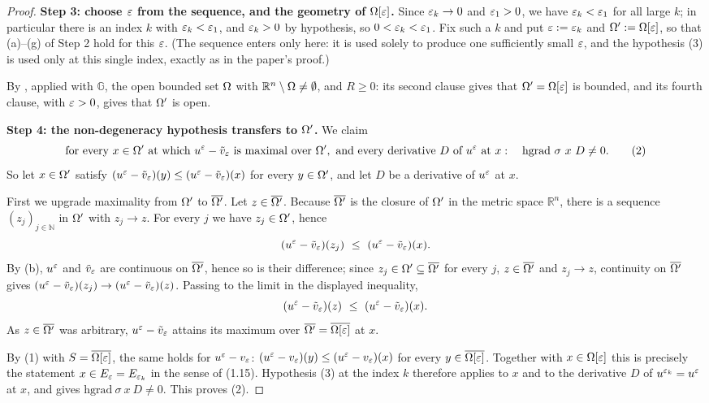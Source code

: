\begin{proof}
\medskip\noindent\textbf{Step 3: choose $\varepsilon$ from the sequence, and the geometry of
$\Omega[\varepsilon]$.} Since $\varepsilon_k\to0$ and $\varepsilon_1>0$, we have $\varepsilon_k<\varepsilon_1$ for all large
$k$; in particular there is an index $k$ with $\varepsilon_k<\varepsilon_1$, and $\varepsilon_k>0$ by
hypothesis, so $0<\varepsilon_k<\varepsilon_1$. Fix such a $k$ and put
$\varepsilon:=\varepsilon_k$ and $\Omega':=\Omega[\varepsilon]$, so that (a)--(g) of Step 2 hold for this $\varepsilon$. (The
sequence enters only here: it is used solely to produce one sufficiently small $\varepsilon$, and
the hypothesis (3) is used only at this single index, exactly as in the paper's proof.)

By , applied with $\mathbb G$, the open bounded set $\Omega$
with $\mathbb R^{n}\setminus\Omega\ne\emptyset$, and $R\ge0$: its second clause gives that
$\Omega'=\Omega[\varepsilon]$ is bounded, and its fourth clause, with $\varepsilon>0$, gives that $\Omega'$ is
open.

\medskip\noindent\textbf{Step 4: the non-degeneracy hypothesis transfers to $\Omega'$.} We
claim
\[
 \text{for every }x\in\Omega'\text{ at which }u^{\varepsilon}-\tilde v_{\varepsilon}\text{ is maximal over }
 \Omega',\ \text{and every derivative }D\text{ of }u^{\varepsilon}\text{ at }x:\quad
 \mathrm{hgrad}\ \sigma\ x\ D\ne0. \tag{2}
\]
So let $x\in\Omega'$ satisfy $(u^{\varepsilon}-\tilde v_{\varepsilon})(y)\le(u^{\varepsilon}-\tilde v_{\varepsilon})(x)$ for
every $y\in\Omega'$, and let $D$ be a derivative of $u^{\varepsilon}$ at $x$.

First we upgrade maximality from $\Omega'$ to $\overline{\Omega'}$. Let $z\in\overline{\Omega'}$.
Because $\overline{\Omega'}$ is the closure of $\Omega'$ in the metric space $\mathbb R^{n}$, there
is a sequence $(z_j)_{j\in\mathbb N}$ in $\Omega'$ with $z_j\to z$. For every $j$ we have
$z_j\in\Omega'$, hence
\[
 (u^{\eps}-\tilde v_{\eps})(z_j)\ \le\ (u^{\eps}-\tilde v_{\eps})(x).
\]
By (b), $u^{\varepsilon}$ and $\tilde v_{\varepsilon}$ are continuous on $\overline{\Omega'}$, hence so is
their difference; since $z_j\in\Omega'\subseteq\overline{\Omega'}$ for every $j$,
$z\in\overline{\Omega'}$ and $z_j\to z$, continuity on $\overline{\Omega'}$ gives
$(u^{\varepsilon}-\tilde v_{\varepsilon})(z_j)\to(u^{\varepsilon}-\tilde v_{\varepsilon})(z)$. Passing to the limit in
the displayed inequality,
\[
 (u^{\eps}-\tilde v_{\eps})(z)\ \le\ (u^{\eps}-\tilde v_{\eps})(x).
\]
As $z\in\overline{\Omega'}$ was arbitrary, $u^{\varepsilon}-\tilde v_{\varepsilon}$ attains its maximum over
$\overline{\Omega'}=\overline{\Omega[\varepsilon]}$ at $x$.

By (1) with $S=\overline{\Omega[\varepsilon]}$, the same holds for $u^{\varepsilon}-v_{\varepsilon}$:
$(u^{\varepsilon}-v_{\varepsilon})(y)\le(u^{\varepsilon}-v_{\varepsilon})(x)$ for every $y\in\overline{\Omega[\varepsilon]}$.
Together with $x\in\Omega[\varepsilon]$ this is precisely the statement $x\in E_{\varepsilon}=E_{\varepsilon_k}$ in
the sense of (1.15). Hypothesis (3) at the index $k$ therefore applies to $x$ and to the
derivative $D$ of $u^{\varepsilon_k}=u^{\varepsilon}$ at $x$, and gives
$\mathrm{hgrad}\ \sigma\ x\ D\ne0$. This proves (2).


\end{proof}
